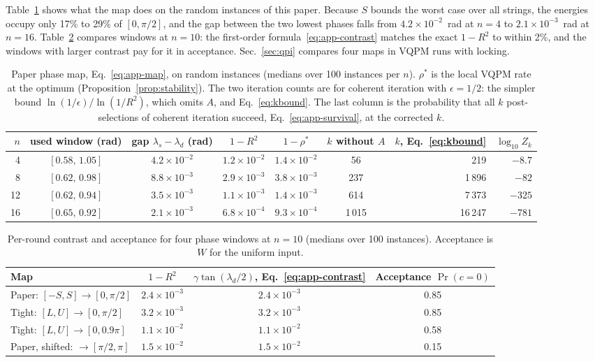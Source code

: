 Table~\ref{tab:app-phase} shows what the map does on the random instances of this paper. Because $S$ bounds the worst case over all strings, the energies occupy only 17\% to 29\% of $[0,\pi/2]$, and the gap between the two lowest phases falls from $4.2\times10^{-2}$~rad at $n=4$ to $2.1\times10^{-3}$~rad at $n=16$. Table~\ref{tab:app-windows} compares windows at $n=10$: the first-order formula~\eqref{eq:app-contrast} matches the exact $1-R^2$ to within 2\%, and the windows with larger contrast pay for it in acceptance.
Sec.~\ref{sec:qpi} compares four maps in VQPM runs with locking.

\begin{table}[ht]
\centering
\caption{Paper phase map, Eq.~\eqref{eq:app-map}, on random instances (medians over 100 instances per $n$). $\rho^*$ is the local VQPM rate at the optimum (Proposition~\ref{prop:stability}). The two iteration counts are for coherent iteration with $\epsilon=1/2$: the simpler bound $\ln(1/\epsilon)/\ln(1/R^2)$, which omits $A$, and Eq.~\eqref{eq:kbound}. The last column is the probability that all $k$ post-selections of coherent iteration succeed, Eq.~\eqref{eq:app-survival}, at the corrected $k$.}
\label{tab:app-phase}
\begin{tabular}{rcccccrr}
\toprule
$n$ & used window (rad) & gap $\lambda_s-\lambda_d$ (rad) & $1-R^2$ & $1-\rho^*$ & $k$ without $A$ & $k$, Eq.~\eqref{eq:kbound} & $\log_{10}Z_k$ \\
\midrule
4  & $[0.58,\,1.05]$ & $4.2\times10^{-2}$ & $1.2\times10^{-2}$ & $1.4\times10^{-2}$ & 56   & 219    & $-8.7$ \\
8  & $[0.62,\,0.98]$ & $8.8\times10^{-3}$ & $2.9\times10^{-3}$ & $3.8\times10^{-3}$ & 237  & 1\,896 & $-82$ \\
12 & $[0.62,\,0.94]$ & $3.5\times10^{-3}$ & $1.1\times10^{-3}$ & $1.4\times10^{-3}$ & 614  & 7\,373 & $-325$ \\
16 & $[0.65,\,0.92]$ & $2.1\times10^{-3}$ & $6.8\times10^{-4}$ & $9.3\times10^{-4}$ & 1\,015 & 16\,247 & $-781$ \\
\bottomrule
\end{tabular}
\end{table}

\begin{table}[ht]
\centering
\caption{Per-round contrast and acceptance for four phase windows at $n=10$ (medians over 100 instances). Acceptance is $W$ for the uniform input.}
\label{tab:app-windows}
\begin{tabular}{lccc}
\toprule
Map & $1-R^2$ & $\gamma\tan(\lambda_d/2)$, Eq.~\eqref{eq:app-contrast} & Acceptance $\Pr(c=0)$ \\
\midrule
Paper: $[-S,S]\to[0,\pi/2]$        & $2.4\times10^{-3}$ & $2.4\times10^{-3}$ & 0.85 \\
Tight: $[L,U]\to[0,\pi/2]$         & $3.2\times10^{-3}$ & $3.2\times10^{-3}$ & 0.85 \\
Tight: $[L,U]\to[0,0.9\pi]$        & $1.1\times10^{-2}$ & $1.1\times10^{-2}$ & 0.58 \\
Paper, shifted: $\to[\pi/2,\pi]$   & $1.5\times10^{-2}$ & $1.5\times10^{-2}$ & 0.15 \\
\bottomrule
\end{tabular}
\end{table}

